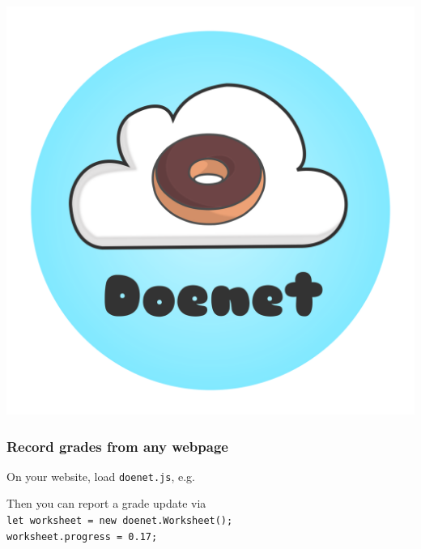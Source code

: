 \documentclass[aspectratio=169,14pt]{beamer}
\begin{document}
\begin{frame}
  \begin{center}
    \includegraphics[height=\textheight]{Doenet_Logo.png}
  \end{center}
\end{frame}

\begin{frame}
  \frametitle{Record grades from any webpage}

  On your website, load \texttt{doenet.js}, e.g. \\
  \quad{}

  \vfill
  
  Then you can report a grade update via \\
  \quad\texttt{let worksheet = new doenet.Worksheet();} \\
  \quad\texttt{worksheet.progress = 0.17;}

  \vfill

\end{frame}
\end{document}
